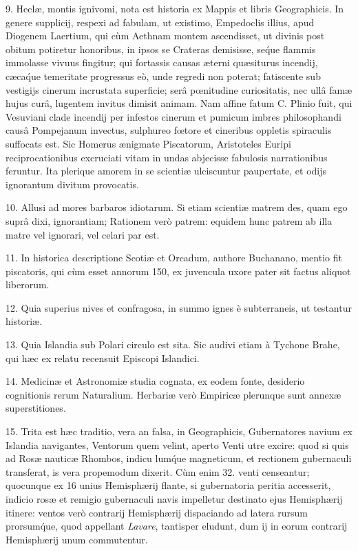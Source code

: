 \documentclass[a4paper, 11pt, oneside, polutonikogreek, german]{article}
\begin{document}
9. Heclæ, montis ignivomi, nota est historia ex Mappis et libris Geographicis. In genere supplicij, respexi ad fabulam, ut existimo, Empedoclis illius, apud Diogenem Laertium, qui cùm Aethnam montem ascendisset, ut divinis post obitum potiretur honoribus, in ipsos se Crateras demisisse, se\'que flammis immolasse vivuus fingitur; qui fortassis causas æterni quæsiturus incendij, cæca\'que temeritate progressus eò, unde regredi non poterat; fatiscente sub vestigijs cinerum incrustata superficie; serâ pœnitudine curiositatis, nec ullâ famæ hujus curâ, lugentem invitus dimisit animam. Nam affine fatum C. Plinio fuit, qui Vesuviani clade incendij per infestos cinerum et pumicum imbres philosophandi causâ Pompejanum invectus, sulphureo fœtore et cineribus oppletis spiraculis suffocats est. Sic Homerus ænigmate Piscatorum, Aristoteles Euripi reciprocationibus excruciati vitam in undas abjecisse fabulosis narrationibus feruntur. Ita plerique amorem in se scientiæ ulciscuntur paupertate, et odijs ignorantum divitum provocatis.

10. Allusi ad mores barbaros idiotarum. Si etiam scientiæ matrem des, quam ego suprâ dixi, ignorantiam; Rationem verò patrem: equidem hunc patrem ab illa matre vel ignorari, vel celari par est.

11. In historica descriptione Scotiæ et Orcadum, authore Buchanano, mentio fit piscatoris, qui cùm esset annorum 150, ex juvencula uxore pater sit factus aliquot liberorum.

12. Quia superius nives et confragosa, in summo ignes è subterraneis, ut testantur historiæ.

13. Quia Islandia sub Polari circulo est sita. Sic audivi etiam à Tychone Brahe, qui hæc ex relatu recensuit Episcopi Islandici.

14. Medicinæ et Astronomiæ studia cognata, ex eodem fonte, desiderio cognitionis rerum Naturalium. Herbariæ verò Empiricæ plerunque sunt annexæ superstitiones.

15. Trita est hæc traditio, vera an falsa, in Geographicis, Gubernatores navium ex Islandia navigantes, Ventorum quem velint, aperto Venti utre excire: quod si quis ad Rosæ nauticæ Rhombos, indicu lum\'que magneticum, et rectionem gubernaculi transferat, is vera propemodum dixerit. Cùm enim 32. venti censeantur; quocunque ex 16 unius Hemisphærij flante, si gubernatoria peritia accesserit, indicio rosæ et remigio gubernaculi navis impelletur destinato ejus Hemisphærij itinere: ventos verò contrarij Hemisphærij dispaciando ad latera rursum prorsum\'que, quod appellant \emph{Lavare}, tantisper eludunt, dum ij in eorum contrarij Hemisphærij unum commutentur.
\end{document}

